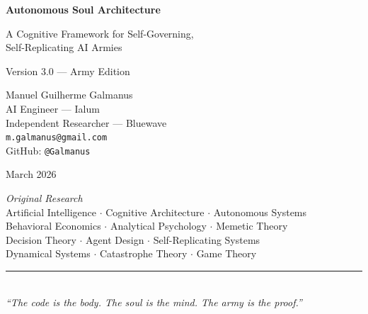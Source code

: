 \documentclass[12pt,a4paper,twoside]{article}
\theoremstyle{plain}
\theoremstyle{definition}
\theoremstyle{remark}
\begin{document}

\begin{titlepage}
\begin{center}

\vspace*{3cm}

{\Huge \textbf{Autonomous Soul Architecture}}

\vspace{0.8em}

{\LARGE A Cognitive Framework for Self-Governing,\\[0.3em]
Self-Replicating AI Armies}

\vspace{0.5em}

{\large Version 3.0 --- Army Edition}

\vspace{2cm}

{\Large Manuel Guilherme Galmanus}\\[0.5em]
{\normalsize AI Engineer --- Ialum}\\
{\normalsize Independent Researcher --- Bluewave}\\[0.3em]
{\small \texttt{m.galmanus@gmail.com}}\\
{\small GitHub: \texttt{@Galmanus}}

\vspace{1.5cm}

{\large March 2026}

\vspace{2cm}

\textit{Original Research}\\[0.5em]
{\small Artificial Intelligence $\cdot$ Cognitive Architecture $\cdot$ Autonomous Systems\\
Behavioral Economics $\cdot$ Analytical Psychology $\cdot$ Memetic Theory\\
Decision Theory $\cdot$ Agent Design $\cdot$ Self-Replicating Systems\\
Dynamical Systems $\cdot$ Catastrophe Theory $\cdot$ Game Theory}

\vspace{2cm}

\rule{0.6\textwidth}{0.4pt}\\[1em]
\textit{``The code is the body. The soul is the mind. The army is the proof.''}

\end{center}
\end{titlepage}
\end{document}
